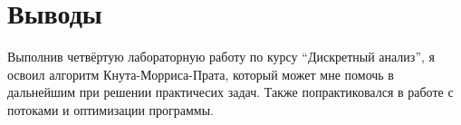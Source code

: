 \section{Выводы}
Выполнив четвёртую лабораторную работу по курсу \enquote{Дискретный анализ}, я освоил алгоритм Кнута-Морриса-Прата, который может мне помочь в дальнейшим при решении практичесих задач. Также попрактиковался в работе с потоками и оптимизации программы.
\pagebreak

